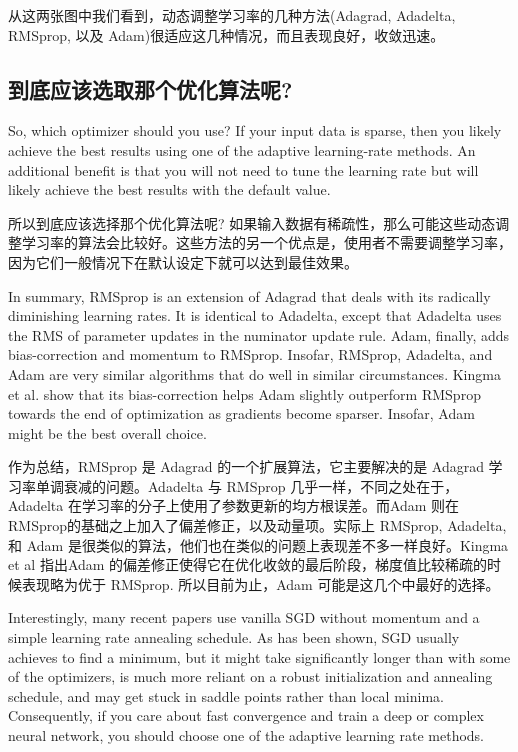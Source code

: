 \documentclass{article}
\begin{document}
从这两张图中我们看到，动态调整学习率的几种方法(Adagrad, Adadelta, RMSprop, 以及 Adam)很适应这几种情况，而且表现良好，收敛迅速。

\subsection{到底应该选取那个优化算法呢?}

So, which optimizer should you use? If your input data is sparse, then you likely achieve the best results using one of the adaptive learning-rate methods. An additional benefit is that you will not need to tune the learning rate but will likely achieve the best results with the default value.

所以到底应该选择那个优化算法呢? 如果输入数据有稀疏性，那么可能这些动态调整学习率的算法会比较好。这些方法的另一个优点是，使用者不需要调整学习率，因为它们一般情况下在默认设定下就可以达到最佳效果。

In summary, RMSprop is an extension of Adagrad that deals with its radically diminishing learning rates. It is identical to Adadelta, except that Adadelta uses the RMS of parameter updates in the numinator update rule. Adam, finally, adds bias-correction and momentum to RMSprop. Insofar, RMSprop, Adadelta, and Adam are very similar algorithms that do well in similar circumstances. Kingma et al. \cite{Kingma2015} show that its bias-correction helps Adam slightly outperform RMSprop towards the end of optimization as gradients become sparser. Insofar, Adam might be the best overall choice.

作为总结，RMSprop 是 Adagrad 的一个扩展算法，它主要解决的是 Adagrad 学习率单调衰减的问题。Adadelta 与 RMSprop 几乎一样，不同之处在于，Adadelta 在学习率的分子上使用了参数更新的均方根误差。而Adam 则在RMSprop的基础之上加入了偏差修正，以及动量项。实际上 RMSprop, Adadelta, 和 Adam 是很类似的算法，他们也在类似的问题上表现差不多一样良好。Kingma et al \cite{Kingma2015} 指出Adam 的偏差修正使得它在优化收敛的最后阶段，梯度值比较稀疏的时候表现略为优于 RMSprop. 所以目前为止，Adam 可能是这几个中最好的选择。

Interestingly, many recent papers use vanilla SGD without momentum and a simple learning rate annealing schedule. As has been shown, SGD usually achieves to find a minimum, but it might take significantly longer than with some of the optimizers, is much more reliant on a robust initialization and annealing schedule, and may get stuck in saddle points rather than local minima. Consequently, if you care about fast convergence and train a deep or complex neural network, you should choose one of the adaptive learning rate methods.
\end{document}
